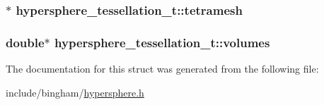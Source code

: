 \label{structhypersphere__tessellation__t_a5963abed3c6d469bae3fd16301ed0f5b}
\hypertarget{structhypersphere__tessellation__t_a0d6d3953f9e958a2f78df65dc2b3b4ee}{
\subsubsection[{tetramesh}]{$\ast$ {\bf hypersphere\_\-tessellation\_\-t::tetramesh}}}
\label{structhypersphere__tessellation__t_a0d6d3953f9e958a2f78df65dc2b3b4ee}
\hypertarget{structhypersphere__tessellation__t_a5cbab443a7da8fb4a0b836b6ae613c23}{
\subsubsection[{volumes}]{\setlength{\rightskip}{0pt plus 5cm}double$\ast$ {\bf hypersphere\_\-tessellation\_\-t::volumes}}}
\label{structhypersphere__tessellation__t_a5cbab443a7da8fb4a0b836b6ae613c23}


The documentation for this struct was generated from the following file:\begin{DoxyCompactItemize}
\item 
include/bingham/\hyperlink{hypersphere_8h}{hypersphere.h}\end{DoxyCompactItemize}
